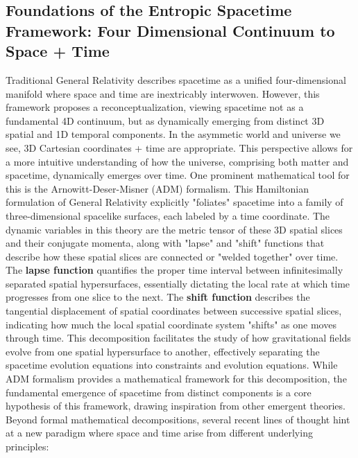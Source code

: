 \documentclass[11pt,a4paper]{article} %
\begin{document}
\subsection{Foundations of the Entropic Spacetime Framework: Four Dimensional Continuum to Space \textnormal{+} Time}
Traditional General Relativity describes spacetime as a unified four-dimensional manifold where space and time are inextricably interwoven. However, this framework proposes a reconceptualization, viewing spacetime not as a fundamental 4D continuum, but as dynamically emerging from distinct 3D spatial and 1D temporal components. In the asymmetic world and universe we see, 3D Cartesian coordinates + time are appropriate. This perspective allows for a more intuitive understanding of how the universe, comprising both matter and spacetime, dynamically emerges over time. One prominent mathematical tool for this is the Arnowitt-Deser-Misner (ADM) formalism.\cite{ADM1962} This Hamiltonian formulation of General Relativity explicitly "foliates" spacetime into a family of three-dimensional spacelike surfaces, each labeled by a time coordinate. The dynamic variables in this theory are the metric tensor of these 3D spatial slices and their conjugate momenta, along with "lapse" and "shift" functions that describe how these spatial slices are connected or "welded together" over time. The \textbf{lapse function} quantifies the proper time interval between infinitesimally separated spatial hypersurfaces, essentially dictating the local rate at which time progresses from one slice to the next. The \textbf{shift function} describes the tangential displacement of spatial coordinates between successive spatial slices, indicating how much the local spatial coordinate system "shifts" as one moves through time. This decomposition facilitates the study of how gravitational fields evolve from one spatial hypersurface to another, effectively separating the spacetime evolution equations into constraints and evolution equations. While ADM formalism provides a mathematical framework for this decomposition, the fundamental emergence of spacetime from distinct components is a core hypothesis of this framework, drawing inspiration from other emergent theories. Beyond formal mathematical decompositions, several recent lines of thought hint at a new paradigm where space and time arise from different underlying principles:
\end{document}
